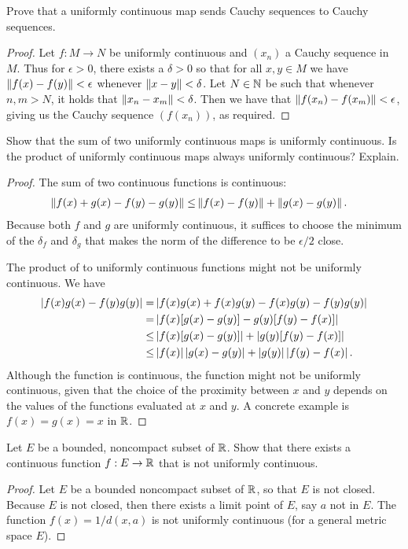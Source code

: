 \begin{exercise}{48}
Prove that a uniformly continuous map sends Cauchy sequences to Cauchy sequences.
\end{exercise}
\begin{proof}
Let $f:M\to N$ be uniformly continuous and $(x_n)$ a Cauchy sequence in $M$.
Thus for $\epsilon>0$, there exists a $\delta>0$ so that for all $x,y\in M$ we have $\left\lVert f(x)-f(y)\right\rVert<\epsilon$ whenever $\left\lVert x-y\right\rVert<\delta$.
Let $N\in\mathbb{N}$ be such that whenever $n,m>N$, it holds that $\left\lVert x_n-x_m\right\rVert<\delta$.
Then we have that $\left\lVert f(x_n)-f(x_m)\right\rVert<\epsilon$, giving us the Cauchy sequence $(f(x_n))$, as required.
\end{proof} 

\begin{exercise}{49}
Show that the sum of two uniformly continuous maps is uniformly continuous.
Is the product of uniformly continuous maps always uniformly continuous?
Explain.
\end{exercise}
\begin{proof}
The sum of two continuous functions is continuous:
\begin{align*}
    \left\lVert f(x)+g(x) - f(y)-g(y)\right\rVert
    \leq& \left\lVert f(x)-f(y)\right\rVert +\left\lVert g(x)-g(y)\right\rVert.
\end{align*}
Because both $f$ and $g$ are uniformly continuous, it suffices to choose the minimum of the $\delta_f$ and $\delta_g$ that makes the norm of the difference to be $\epsilon/2$ close.

The product of to uniformly continuous functions might not be uniformly continuous.
We have 
\begin{align*}
    \left\lvert f(x)g(x) - f(y)g(y)\right\rvert 
    =& \left\lvert f(x)g(x) + f(x)g(y) - f(x)g(y) - f(y)g(y)\right\rvert\\
    =& \left\lvert f(x)[g(x)-g(y)] - g(y)[f(y)-f(x)]\right\rvert\\
    \leq& \left\lvert f(x)[g(x)-g(y)]\right\rvert + \left\lvert g(y)[f(y)-f(x)]\right\rvert\\
    \leq& \left\lvert f(x)\right\rvert\left\lvert g(x)-g(y)\right\rvert + \left\lvert g(y)\right\rvert\left\lvert f(y)-f(x)\right\rvert.
\end{align*}
Although the function is continuous, the function might not be uniformly continuous, given that the choice of the proximity between $x$ and $y$ depends on the values of the functions evaluated at $x$ and $y$.
A concrete example is $f(x)=g(x)=x$ in $\mathbb{R}$.
\end{proof} 

\begin{exercise}{54}
Let $E$ be a bounded, noncompact subset of $\mathbb{R}$.
Show that there exists a continuous function $f:E\to\mathbb{R}$ that is not uniformly continuous.
\end{exercise}
\begin{proof}
Let $E$ be a bounded noncompact subset of $\mathbb{R}$, so that $E$ is not closed.
Because $E$ is not closed, then there exists a limit point of $E$, say $a$ not in $E$.
The function $f(x)=1/d(x,a)$ is not uniformly continuous (for a general metric space $E$).
\end{proof} 

